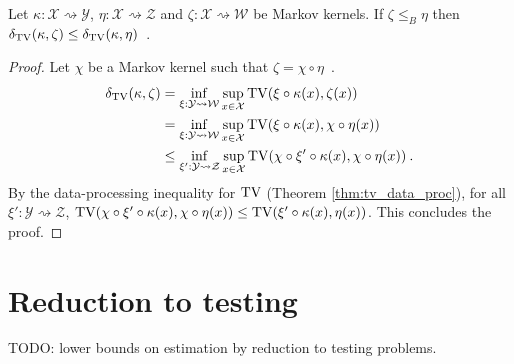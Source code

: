 \begin{lemma}
  \label{lem:deficiency_mono_right}
  Let $\kappa: \mathcal X \rightsquigarrow \mathcal Y$, $\eta : \mathcal X \rightsquigarrow \mathcal Z$ and $\zeta : \mathcal X \rightsquigarrow \mathcal W$ be Markov kernels.
  If $\zeta \le_B \eta$ then $\delta_{\operatorname{TV}}(\kappa, \zeta) \le \delta_{\operatorname{TV}}(\kappa, \eta)$~.
\end{lemma}

\begin{proof}%
{}
Let $\chi$ be a Markov kernel such that $\zeta = \chi \circ \eta$~.
\begin{align*}
\delta_{\operatorname{TV}}(\kappa, \zeta)
&= \inf_{\xi : \mathcal Y \rightsquigarrow \mathcal W} \sup_{x \in \mathcal X} \operatorname{TV}(\xi \circ \kappa (x), \zeta(x))
\\
&= \inf_{\xi : \mathcal Y \rightsquigarrow \mathcal W} \sup_{x \in \mathcal X} \operatorname{TV}(\xi \circ \kappa (x), \chi \circ \eta(x))
\\
&\le \inf_{\xi' : \mathcal Y \rightsquigarrow \mathcal Z} \sup_{x \in \mathcal X} \operatorname{TV}(\chi \circ \xi' \circ \kappa (x), \chi \circ \eta(x))
\: .
\end{align*}
By the data-processing inequality for $\operatorname{TV}$ (Theorem \ref{thm:tv_data_proc}), for all $\xi' : \mathcal Y \rightsquigarrow \mathcal Z$, $\operatorname{TV}(\chi \circ \xi' \circ \kappa (x), \chi \circ \eta(x)) \le \operatorname{TV}(\xi' \circ \kappa (x), \eta(x))$.
This concludes the proof.
\end{proof}

\section{Reduction to testing}

TODO: lower bounds on estimation by reduction to testing problems.